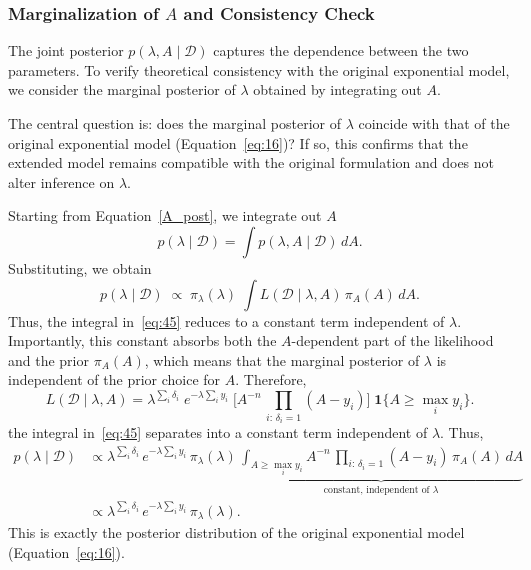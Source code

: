 \subsubsection{Marginalization of \texorpdfstring{$A$}{A} and Consistency Check}
\label{边际化章节}
The joint posterior $p(\lambda, A \mid \mathcal D)$ captures the dependence between the two parameters. To verify theoretical consistency with the original exponential model, we consider the marginal posterior of $\lambda$ obtained by integrating out $A$.   

The central question is: does the marginal posterior of $\lambda$ coincide with that of the original exponential model (Equation~\ref{eq:16})? If so, this confirms that the extended model remains compatible with the original formulation and does not alter inference on $\lambda$.

Starting from Equation~\eqref{A_post}, we integrate out $A$
\begin{equation}
    p(\lambda \mid \mathcal D)
= \int p(\lambda, A \mid \mathcal D)\,dA.
\end{equation}
Substituting, we obtain
\begin{equation}
    p(\lambda \mid \mathcal D)\;\propto\;\pi_\lambda(\lambda)\;\int L(\mathcal D \mid \lambda, A)\,\pi_A(A)\,dA.
    \label{eq:45}
\end{equation}
Thus, the integral in~\eqref{eq:45} reduces to a constant term independent of $\lambda$. 
Importantly, this constant absorbs both the $A$-dependent part of the likelihood and the prior $\pi_A(A)$, which means that the marginal posterior of $\lambda$ is independent of the prior choice for $A$. 
Therefore,
\begin{equation}
    L(\mathcal D \mid \lambda, A)
= \lambda^{\sum_i \delta_i}\;
e^{-\lambda \sum_i y_i}\;
\Bigg[
A^{-n}\,\prod_{i:\,\delta_i=1}(A-y_i)
\Bigg]\;\mathbf 1\{A \ge \max_i y_i\}.
\end{equation}
the integral in~\eqref{eq:45} separates into a constant term independent of $\lambda$. Thus,
\begin{align}
\label{eq:47}
p(\lambda \mid \mathcal{D})
&\propto \lambda^{\sum_i \delta_i}\,
e^{-\lambda \sum_i y_i}\,
\pi_\lambda(\lambda)\,
\underbrace{\int_{A \ge \max_i y_i}
A^{-n}\,\prod_{i:\,\delta_i=1}(A-y_i)\,\pi_A(A)\,dA}_{\text{constant, independent of }\lambda} \\[2pt]
&\propto \lambda^{\sum_i \delta_i}\, e^{-\lambda \sum_i y_i}\, \pi_{\lambda}(\lambda).
\end{align}
This is exactly the posterior distribution of the original exponential model (Equation~\ref{eq:16}).  


